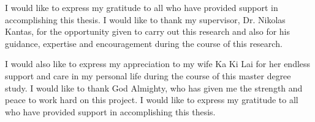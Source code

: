 

\begin{acknowledgements}      %
  I would like to express my gratitude to all who have provided support  in accomplishing this thesis. I would like to thank my supervisor, Dr. Nikolas Kantas, for the opportunity given to carry out this research and also for his guidance, expertise and encouragement during the course of this research.
  
 I would also like to express my appreciation to my wife Ka Ki Lai for her endless support and care in my personal life during the course of this master degree study. I would like to thank God Almighty, who has given me the strength and peace to work hard on this project. I would like to express my gratitude to all who have provided support in accomplishing this thesis. 

\end{acknowledgements}


